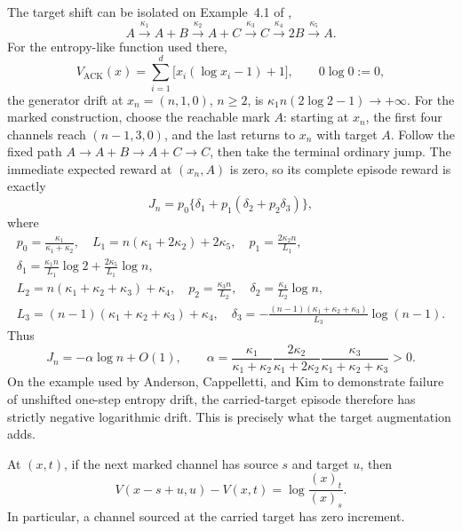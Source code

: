 \begin{remark}\label{rem:ack-example}
The target shift can be isolated on Example~4.1 of
\citet{AndersonCappellettiKim2020},
\[
 A\xrightarrow{\kappa_1}A+B\xrightarrow{\kappa_2}A+C
 \xrightarrow{\kappa_3}C\xrightarrow{\kappa_4}2B
 \xrightarrow{\kappa_5}A.
\]
For the entropy-like function used there,
\[
 V_{\mathrm{ACK}}(x)=
 \sum_{i=1}^d\bigl[x_i(\log x_i-1)+1\bigr],
 \qquad 0\log0:=0,
\]
the generator drift at \(x_n=(n,1,0)\), \(n\ge2\), is
\(\kappa_1n(2\log2-1)\to+\infty\).  For the marked construction,
choose the reachable mark \(A\): starting at \(x_n\), the first four channels
reach \((n-1,3,0)\), and the last returns to \(x_n\) with target \(A\).
Follow the fixed path \(A\to A+B\to A+C\to C\), then take the terminal
ordinary jump.  The immediate expected reward at \((x_n,A)\) is zero, so its
complete episode reward is exactly
\begin{equation}\label{eq:ack-episode}
 J_n=p_0\{\delta_1+p_1(\delta_2+p_2\delta_3)\},
\end{equation}
where
\[
\begin{gathered}
 p_0=\frac{\kappa_1}{\kappa_1+\kappa_2},\quad
 L_1=n(\kappa_1+2\kappa_2)+2\kappa_5,\quad
 p_1=\frac{2\kappa_2n}{L_1},\\
 \delta_1=\frac{\kappa_1n}{L_1}\log2
       +\frac{2\kappa_5}{L_1}\log n,\\
 L_2=n(\kappa_1+\kappa_2+\kappa_3)+\kappa_4,\quad
 p_2=\frac{\kappa_3n}{L_2},\quad
 \delta_2=\frac{\kappa_4}{L_2}\log n,\\
 L_3=(n-1)(\kappa_1+\kappa_2+\kappa_3)+\kappa_4,\quad
 \delta_3=-\frac{(n-1)(\kappa_1+\kappa_2+\kappa_3)}{L_3}\log(n-1).
\end{gathered}
\]
Thus
\[
 J_n=-\alpha\log n+O(1),\qquad
 \alpha=\frac{\kappa_1}{\kappa_1+\kappa_2}
        \frac{2\kappa_2}{\kappa_1+2\kappa_2}
        \frac{\kappa_3}{\kappa_1+\kappa_2+\kappa_3}>0.
\]
On the example used by Anderson, Cappelletti, and Kim to demonstrate failure
of unshifted one-step entropy drift, the carried-target episode therefore has
strictly negative logarithmic drift.  This is precisely what the target
augmentation adds.
\end{remark}

\begin{lemma}\label{lem:identity}
At \((x,t)\), if the next marked channel has source \(s\) and target \(u\),
then
\begin{equation}\label{eq:identity}
  V(x-s+u,u)-V(x,t)=\log\frac{(x)_t}{(x)_s}.
\end{equation}
In particular, a channel sourced at the carried target has zero increment.
\end{lemma}

